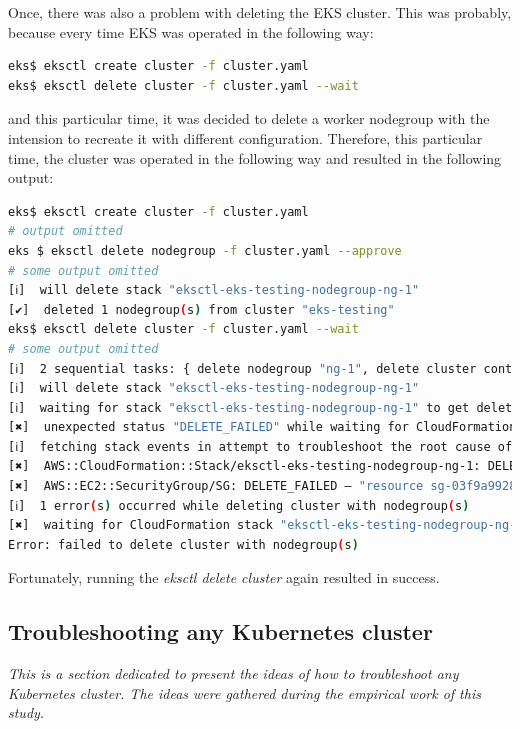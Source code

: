 Once, there was also a problem with deleting the EKS cluster. This was probably, because every time EKS was operated in the following way:
\begin{lstlisting}[basicstyle=\tiny,caption={TODO},captionpos=b,language=Bash,xleftmargin=1cm]
eks$ eksctl create cluster -f cluster.yaml
eks$ eksctl delete cluster -f cluster.yaml --wait
\end{lstlisting}
and this particular time, it was decided to delete a worker nodegroup with the intension to recreate it with different configuration. Therefore, this particular time, the cluster was operated in the following way and resulted in the following output:
\begin{lstlisting}[basicstyle=\tiny,caption={TODO},captionpos=b,language=Bash,xleftmargin=1cm]
eks$ eksctl create cluster -f cluster.yaml
# output omitted
eks $ eksctl delete nodegroup -f cluster.yaml --approve
# some output omitted
[ℹ]  will delete stack "eksctl-eks-testing-nodegroup-ng-1"
[✔]  deleted 1 nodegroup(s) from cluster "eks-testing"
eks$ eksctl delete cluster -f cluster.yaml --wait
# some output omitted
[ℹ]  2 sequential tasks: { delete nodegroup "ng-1", delete cluster control plane "eks-testing" }
[ℹ]  will delete stack "eksctl-eks-testing-nodegroup-ng-1"
[ℹ]  waiting for stack "eksctl-eks-testing-nodegroup-ng-1" to get deleted
[✖]  unexpected status "DELETE_FAILED" while waiting for CloudFormation stack "eksctl-eks-testing-nodegroup-ng-1"
[ℹ]  fetching stack events in attempt to troubleshoot the root cause of the failure
[✖]  AWS::CloudFormation::Stack/eksctl-eks-testing-nodegroup-ng-1: DELETE_FAILED – "The following resource(s) failed to delete: [SG]. "
[✖]  AWS::EC2::SecurityGroup/SG: DELETE_FAILED – "resource sg-03f9a9928f765ecae has a dependent object (Service: AmazonEC2; Status Code: 400; Error Code: DependencyViolation; Request ID: 682fd971-5ec7-472e-9eee-4d52a44f9455)"
[ℹ]  1 error(s) occurred while deleting cluster with nodegroup(s)
[✖]  waiting for CloudFormation stack "eksctl-eks-testing-nodegroup-ng-1": ResourceNotReady: failed waiting for successful resource state
Error: failed to delete cluster with nodegroup(s)
\end{lstlisting}
Fortunately, running the \textit{eksctl delete cluster} again resulted in success.

\subsection{Troubleshooting any Kubernetes cluster}
\textit{This is a section dedicated to present the ideas of how to troubleshoot any Kubernetes cluster. The ideas were gathered during the empirical work of this study.}
\\

